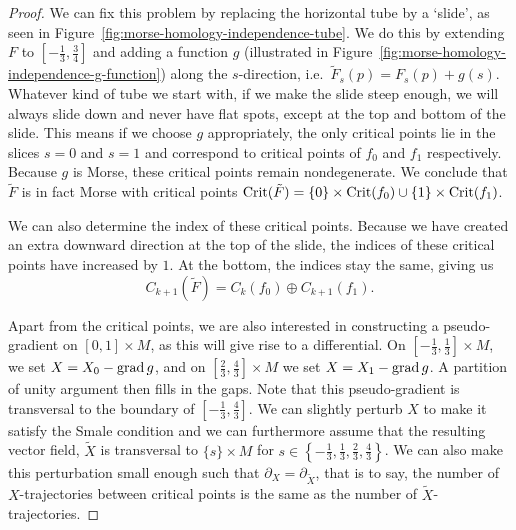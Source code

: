 \begin{proof}
We can fix this problem by replacing the horizontal tube by a `slide', as seen in Figure~\ref{fig:morse-homology-independence-tube}.
We do this by extending $F$ to $[-\frac{1}{3}, \frac{3}{4}]$ and adding a function $g$ (illustrated in Figure~\ref{fig:morse-homology-independence-g-function}) along the $s$-direction, i.e.\ $\tilde{F}_s(p) = F_s(p) + g(s)$.
Whatever kind of tube we start with, if we make the slide steep enough, we will always slide down and never have flat spots, except at the top and bottom of the slide.
This means if we choose $g$ appropriately, the only critical points lie in the slices $s=0$ and  $s=1$ and correspond to critical points of $f_0$ and $f_1$ respectively.
Because $g$ is Morse, these critical points remain nondegenerate.
We conclude that $\tilde{F}$ is in fact Morse with critical points $\operatorname{Crit}(\tilde{F}) = \{0\} \times \operatorname{Crit}(f_0) \cup \{1\} \times \operatorname{Crit}(f_1)$.

We can also determine the index of these critical points.
Because we have created an extra downward direction at the top of the slide, the indices of these critical points have increased by $1$.
At the bottom, the indices stay the same, giving us
\[
    C_{k+1}(\tilde{F}) = C_k(f_0) \oplus C_{k+1}(f_1)
.\] 

Apart from the critical points, we are also interested in constructing a pseudo-gradient on $[0,1]\times M$, as this will give rise to a differential.
 On $[-\frac{1}{3}, \frac{1}{3}] \times M$, we set $X = X_0 - \operatorname{grad} g$, and on $\left[\frac{2}{3}, \frac{4}{3}\right] \times M$ we set $X = X_1 - \operatorname{grad} g$.
A partition of unity argument then fills in the gaps.
Note that this pseudo-gradient is transversal to the boundary of $\left[-\frac{1}{3}, \frac{4}{3}\right]$.
We can slightly perturb $X$ to make it satisfy the Smale condition and we can furthermore assume that the resulting vector field, $\tilde{X}$ is transversal to $ \{s\} \times M$ for $s \in \left\{-\frac{1}{3}, \frac{1}{3}, \frac{2}{3}, \frac{4}{3}\right\}$.
We can also make this perturbation small enough such that $\partial_{X} = \partial_{\tilde{X}}$, that is to say, the number of $X$-trajectories between critical points is the same as the number of $\tilde{X}$-trajectories.


\end{proof}
